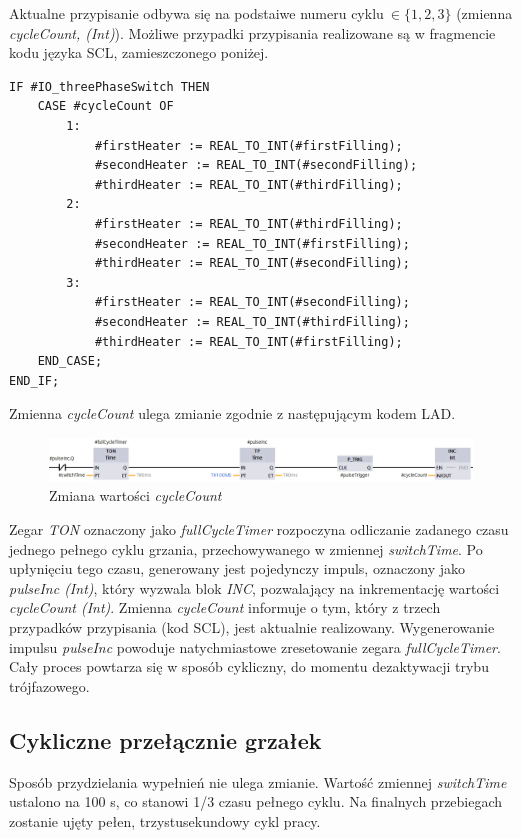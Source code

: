 \documentclass[a4paper,twoside,12pt]{book}
\begin{document}
\newpage
\noindent Aktualne przypisanie odbywa się na podstaiwe numeru cyklu\(\ \in \{1, 2, 3\}\) (zmienna \textit{cycleCount, (Int)}). Możliwe przypadki przypisania realizowane są w fragmencie kodu języka SCL, zamieszczonego poniżej.\\

\begin{lstlisting}
IF #IO_threePhaseSwitch THEN
    CASE #cycleCount OF
        1:  
            #firstHeater := REAL_TO_INT(#firstFilling);
            #secondHeater := REAL_TO_INT(#secondFilling);
            #thirdHeater := REAL_TO_INT(#thirdFilling);
        2:  
            #firstHeater := REAL_TO_INT(#thirdFilling);
            #secondHeater := REAL_TO_INT(#firstFilling);
            #thirdHeater := REAL_TO_INT(#secondFilling);
        3:
            #firstHeater := REAL_TO_INT(#secondFilling);
            #secondHeater := REAL_TO_INT(#thirdFilling);
            #thirdHeater := REAL_TO_INT(#firstFilling);
    END_CASE;
END_IF;
\end{lstlisting}

\noindent Zmienna \textit{cycleCount} ulega zmianie zgodnie z następującym kodem LAD.

\begin{figure}[h]
	\centering
	\includegraphics[width=1\textwidth]{./img/cycleCount.png}
	\caption{Zmiana wartości \textit{cycleCount}}
	\label{fig:CycleCount}
\end{figure}

\noindent Zegar \textit{TON} oznaczony jako \textit{fullCycleTimer} rozpoczyna odliczanie zadanego czasu jednego pełnego cyklu grzania, przechowywanego w zmiennej \textit{switchTime}. Po upłynięciu tego czasu, generowany jest pojedynczy impuls, oznaczony jako \textit{pulseInc (Int)}, który wyzwala blok \textit{INC}, pozwalający na inkrementację wartości \textit{cycleCount (Int)}. Zmienna \textit{cycleCount} informuje o tym, który z trzech przypadków przypisania (kod SCL), jest aktualnie realizowany. Wygenerowanie impulsu \textit{pulseInc} powoduje natychmiastowe zresetowanie zegara \textit{fullCycleTimer}. Cały proces powtarza się w sposób cykliczny, do momentu dezaktywacji trybu trójfazowego.

\newpage
\subsection{Cykliczne przełącznie grzałek}
Sposób przydzielania wypełnień nie ulega zmianie. Wartość zmiennej \textit{switchTime} ustalono na 100 s, co stanowi 1/3 czasu pełnego cyklu. Na finalnych przebiegach zostanie ujęty pełen, trzystusekundowy cykl pracy.
\end{document}

